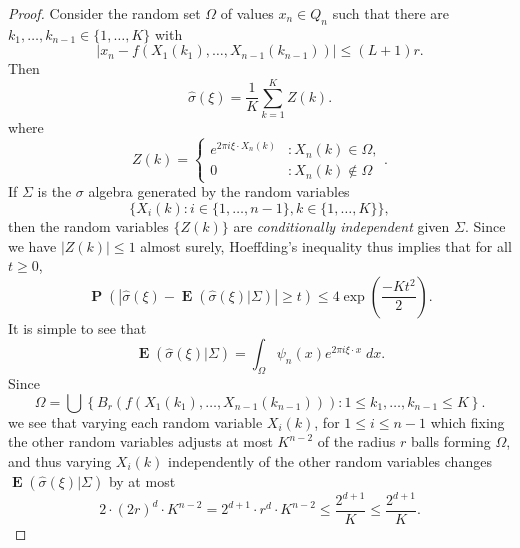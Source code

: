 \documentclass[dvipsnames,letterpaper,12pt]{article}
\numberwithin{equation}{section}
\numberwithin{theorem}{section}
\DeclareMathOperator{\EE}{\mathbf{E}}
\DeclareMathOperator{\PP}{\mathbf{P}}
\begin{document}
\begin{proof}
    Consider the random set $\Omega$ of values $x_n \in Q_n$ such that there are $k_1,\dots,k_{n-1} \in \{ 1,\dots,K \}$ with
    \begin{equation}
        |x_n - f(X_1(k_1),\dots,X_{n-1}(k_{n-1}))| \leq (L+1)r.
    \end{equation}
    Then
    \begin{equation}
        \widehat{\sigma}(\xi) = \frac{1}{K} \sum_{k = 1}^K Z(k).
    \end{equation}
    where
    \[ Z(k) = \begin{cases} e^{2 \pi i \xi \cdot X_n(k)} &: X_n(k) \in \Omega, \\ 0 &: X_n(k) \not \in \Omega \end{cases}. \]
    If $\Sigma$ is the $\sigma$ algebra generated by the random variables
    \[ \{ X_i(k) : i \in \{ 1, \dots, n-1 \}, k \in \{ 1, \dots, K \} \}, \]
    then the random variables $\{ Z(k) \}$ are \emph{conditionally independent} given $\Sigma$. Since we have $|Z(k)| \leq 1$ almost surely, Hoeffding's inequality thus implies that for all $t \geq 0$,
    \begin{equation} \label{equationCOIJCOIJX1232312}
        \PP \left( \left| \widehat{\sigma}(\xi) - \EE(\widehat{\sigma}(\xi)|\Sigma) \right| \geq t \right) \leq 4 \exp \left( \frac{-K t^2}{2} \right).
    \end{equation}
    It is simple to see that
    \begin{equation}
        \EE(\widehat{\sigma}(\xi) | \Sigma) = \int_\Omega \psi_n(x) e^{2 \pi i \xi \cdot x}\; dx.
    \end{equation}
    Since
    \begin{equation}
        \Omega = \bigcup \left\{ B_r(f(X_1(k_1),\dots,X_{n-1}(k_{n-1}))) : 1 \leq k_1,\dots,k_{n-1} \leq K \right\}.
    \end{equation}
    we see that varying each random variable $X_i(k)$, for $1 \leq i \leq n-1$ which fixing the other random variables adjusts at most $K^{n-2}$ of the radius $r$ balls forming $\Omega$, and thus varying $X_i(k)$ independently of the other random variables changes $\EE(\widehat{\sigma}(\xi)|\Sigma)$ by at most
    \begin{equation}
        2 \cdot (2r)^d \cdot K^{n-2} = 2^{d+1} \cdot r^d \cdot K^{n-2} \leq \frac{2^{d+1}}{K} \leq \frac{2^{d+1}}{K}.
    \end{equation}

\end{proof}
\end{document}
